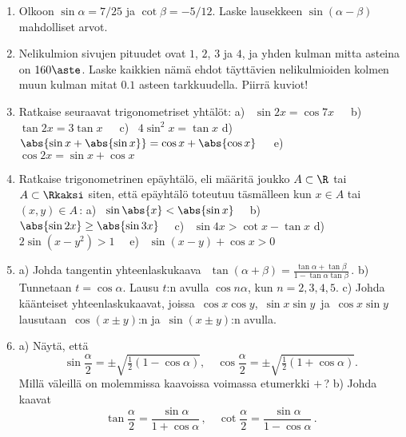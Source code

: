 \Harj
\begin{enumerate}

\item
Olkoon $\sin\alpha=7/25$ ja $\cot\beta=-5/12$. Laske lausekkeen $\sin(\alpha-\beta)$ mahdolliset
arvot.

\item
Nelikulmion sivujen pituudet ovat $1$, $2$, $3$ ja $4$, ja yhden kulman mitta asteina on
$160\aste$. Laske kaikkien nämä ehdot täyttävien nelikulmioiden kolmen muun kulman mitat
$0.1$ asteen tarkkuudella. Piirrä kuviot! 

\item
Ratkaise seuraavat trigonometriset yhtälöt: \newline
a) \ $\sin 2x=\cos 7x\quad\,$ b) \ $\tan 2x=3\tan x\quad\,$ 
c) \ $4\sin^2 x=\tan x$ \newline
d) \ $\abs{\sin x+\abs{\sin x}}=\cos x+\abs{\cos x}\quad\,$ e) \ $\cos 2x=\sin x + \cos x$ 

\item
Ratkaise trigonometrinen epäyhtälö, eli määritä joukko $A\subset\R$ tai $A\subset\Rkaksi$
siten, että epäyhtälö toteutuu täsmälleen kun $x \in A$ tai $(x,y) \in A$\,: \newline
a) \ $\sin\abs{x}<\abs{\sin x}\quad$ b) \ $\abs{\sin 2x}\ge\abs{\sin 3x}\quad$
c) \ $\sin 4x>\cot x-\tan x$ \newline
d) \ $2\sin(x-y^2)>1 \quad$ e) \ $\sin(x-y)+\cos x>0$

\item
a) Johda tangentin yhteenlaskukaava $\ \displaystyle{\,\tan(\alpha + \beta)
   =\frac{\tan\alpha + \tan\beta}{1-\tan\alpha\tan\beta}\,}.$ \vspace{1mm}\newline
b) Tunnetaan $t=\cos\alpha$. Lausu $t$:n avulla $\cos n\alpha$, kun $n=2,3,4,5$. \newline
c) Johda käänteiset yhteenlaskukaavat, joissa $\,\cos x \cos y$, $\,\sin x\sin y\,$ ja \newline
$\,\cos x\sin y\,$ lausutaan $\,\cos{(x\pm y)}$:n ja $\,\sin{(x\pm y)}$:n avulla.

\item \label{H-II-6: trigtuloksia}
a) Näytä, että
\[
\sin\frac{\alpha}{2}=\pm\sqrt{\tfrac{1}{2}(1-\cos\alpha)}, \quad
\cos\frac{\alpha}{2}=\pm\sqrt{\tfrac{1}{2}(1+\cos\alpha)}.
\]
Millä väleillä on molemmissa kaavoissa voimassa etumerkki $+$\,? \newline
b) Johda kaavat
\[
\tan \frac{\alpha}{2}=\frac{\sin \alpha}{1+\cos \alpha}\,, \quad
  \cot \frac{\alpha}{2}=\frac{\sin \alpha}{1-\cos \alpha}\,.
\]


\end{enumerate}
